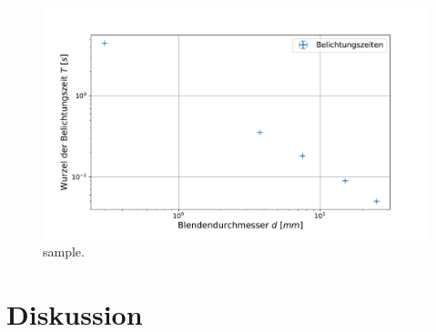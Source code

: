 			\begin{figure}[ht]
				\centering
				\includegraphics[width=1\textwidth]{data/Zeitvergleich.pdf}
				\caption{sample.}
				\label{fig:Belichtung}	
			\end{figure}
			
	
		
\section{Diskussion}
	
